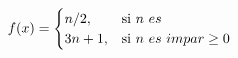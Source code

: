 \documentclass[preview]{standalone}
\begin{document}
\begin{align*}
f(x) = \begin{cases} n/2, & \text{si } n\ es\par \\ 3n+1, & \text{si } n \ es \ impar \geq 0 \end{cases}
\end{align*}
\end{document}
